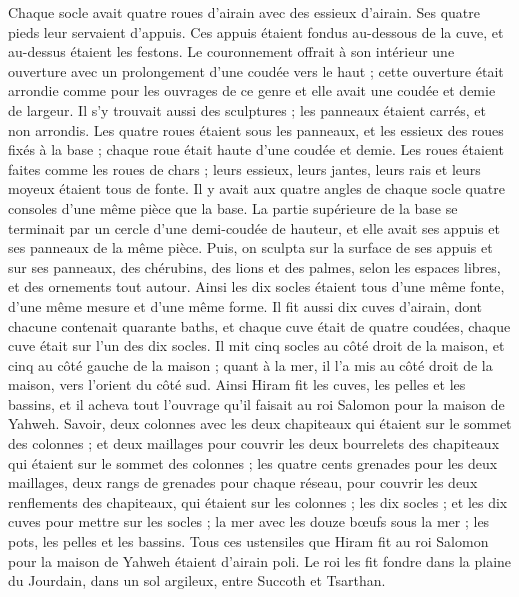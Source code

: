 \begin{multicols}{2}
Chaque socle avait quatre roues d'airain avec des essieux d'airain. Ses quatre pieds leur servaient d’appuis. Ces appuis étaient fondus au-dessous de la cuve, et au-dessus étaient les festons.
Le couronnement offrait à son intérieur une ouverture avec un prolongement d'une coudée vers le haut ; cette ouverture était arrondie comme pour les ouvrages de ce genre et elle avait une coudée et demie de largeur. Il s’y trouvait aussi des sculptures ; les panneaux étaient carrés, et non arrondis.
Les quatre roues étaient sous les panneaux, et les essieux des roues fixés à la base ; chaque roue était haute d'une coudée et demie.
Les roues étaient faites comme les roues de chars ; leurs essieux, leurs jantes, leurs rais et leurs moyeux étaient tous de fonte.
Il y avait aux quatre angles de chaque socle quatre consoles d’une même pièce que la base.
La partie supérieure de la base se terminait par un cercle d’une demi-coudée de hauteur, et elle avait ses appuis et ses panneaux de la même pièce.
Puis, on sculpta sur la surface de ses appuis et sur ses panneaux, des chérubins, des lions et des palmes, selon les espaces libres, et des ornements tout autour.
Ainsi les dix socles étaient tous d’une même fonte, d’une même mesure et d’une même forme.
Il fit aussi dix cuves d'airain, dont chacune contenait quarante baths, et chaque cuve était de quatre coudées, chaque cuve était sur l’un des dix socles.
Il mit cinq socles au côté droit de la maison, et cinq au côté gauche de la maison ; quant à la mer, il l’a mis au côté droit de la maison, vers l'orient du côté sud.
Ainsi Hiram fit les cuves, les pelles et les bassins, et il acheva tout l'ouvrage qu'il faisait au roi Salomon pour la maison de Yahweh.
Savoir, deux colonnes avec les deux chapiteaux qui étaient sur le sommet des colonnes ; et deux maillages pour couvrir les deux bourrelets des chapiteaux qui étaient sur le sommet des colonnes ;
les quatre cents grenades pour les deux maillages, deux rangs de grenades pour chaque réseau, pour couvrir les deux renflements des chapiteaux, qui étaient sur les colonnes ;
les dix socles ; et les dix cuves pour mettre sur les socles ;
la mer avec les douze bœufs sous la mer ;
les pots, les pelles et les bassins. Tous ces ustensiles que Hiram fit au roi Salomon pour la maison de Yahweh étaient d'airain poli.
Le roi les fit fondre dans la plaine du Jourdain, dans un sol argileux, entre Succoth et Tsarthan.

\end{multicols}
